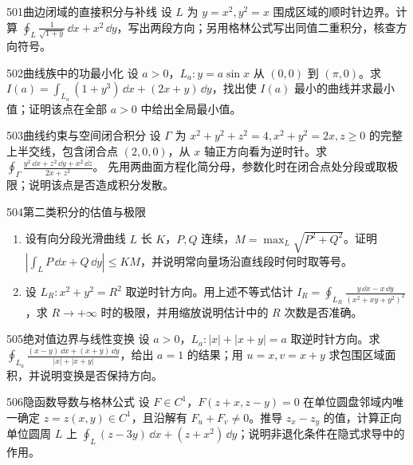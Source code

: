 \begin{exercise}{501}{曲边闭域的直接积分与补线}
设 $L$ 为 $y=x^2,y^2=x$ 围成区域的顺时针边界。计算 $\oint_L\frac1{\sqrt{1+y}}\,\dd x+x^2\,\dd y$，写出两段方向；另用格林公式写出同值二重积分，核查方向符号。
\end{exercise}

\begin{exercise}{502}{曲线族中的功最小化}
设 $a>0$，$L_a:y=a\sin x$ 从 $(0,0)$ 到 $(\pi,0)$。求 $I(a)=\int_{L_a}(1+y^3)\,\dd x+(2x+y)\,\dd y$，找出使 $I(a)$ 最小的曲线并求最小值；证明该点在全部 $a>0$ 中给出全局最小值。
\end{exercise}

\begin{exercise}{503}{曲线约束与空间闭合积分}
设 $\Gamma$ 为 $x^2+y^2+z^2=4,x^2+y^2=2x,z\geq0$ 的完整上半交线，包含闭合点 $(2,0,0)$，从 $x$ 轴正方向看为逆时针。求
$\oint_\Gamma\frac{y^2\,\dd x+z^2\,\dd y+x^2\,\dd z}{2x+z^2}$。
先用两曲面方程化简分母，参数化时在闭合点处分段或取极限；说明该点是否造成积分发散。
\end{exercise}

\begin{exercise}{504}{第二类积分的估值与极限}
\begin{enumerate}[label=(\arabic*)]
\item 设有向分段光滑曲线 $L$ 长 $K$，$P,Q$ 连续，$M=\max_L\sqrt{P^2+Q^2}$。证明 $|\int_LP\,\dd x+Q\,\dd y|\leq KM$，并说明常向量场沿直线段时何时取等号。
\item 设 $L_R:x^2+y^2=R^2$ 取逆时针方向。用上述不等式估计 $I_R=\oint_{L_R}\frac{y\,\dd x-x\,\dd y}{(x^2+xy+y^2)^2}$，求 $R\to+\infty$ 时的极限，并用缩放说明估计中的 $R$ 次数是否准确。
\end{enumerate}
\end{exercise}

\begin{exercise}{505}{绝对值边界与线性变换}
设 $a>0$，$L_a:|x|+|x+y|=a$ 取逆时针方向。求
$\oint_{L_a}\frac{(x-y)\,\dd x+(x+y)\,\dd y}{|x|+|x+y|}$，给出 $a=1$ 的结果；用 $u=x,v=x+y$ 求包围区域面积，并说明变换是否保持方向。
\end{exercise}

\begin{exercise}{506}{隐函数导数与格林公式}
设 $F\in C^1$，$F(z+x,z-y)=0$ 在单位圆盘邻域内唯一确定 $z=z(x,y)\in C^1$，且沿解有 $F_u+F_v\ne0$。推导 $z_x-z_y$ 的值，计算正向单位圆周 $L$ 上
$\oint_L(z-3y)\,\dd x+(z+x^2)\,\dd y$；说明非退化条件在隐式求导中的作用。
\end{exercise}

